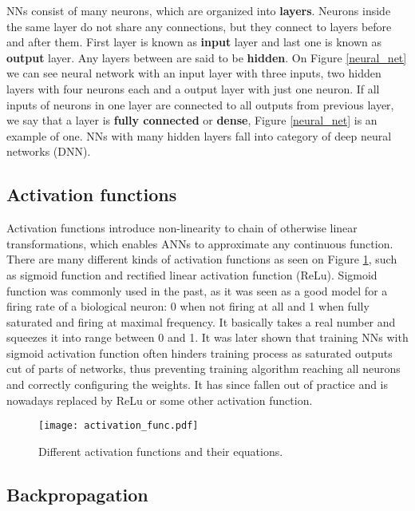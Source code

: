 NNs consist of many neurons, which are organized into \textbf{layers}.
Neurons inside the same layer do not share any connections, but they connect to layers before and after them.
First layer is known as \textbf{input} layer and last one is known as \textbf{output} layer. 
Any layers between are said to be \textbf{hidden}. 
On Figure \ref{neural_net} we can see neural network with an input layer with three inputs, two hidden layers with four neurons each and a output layer with just one neuron.
If all inputs of neurons in one layer are connected to all outputs from previous layer, we say that a layer is \textbf{fully connected} or \textbf{dense}, Figure \ref{neural_net} is an example of one.
NNs with many hidden layers fall into category of deep neural networks (DNN).


\subsection{ Activation functions}

Activation functions introduce non-linearity to chain of otherwise linear transformations, which enables ANNs to approximate any continuous function\cite{geron}.
There are many different kinds of activation functions as seen on Figure \ref{activation_functions}, such as sigmoid function and rectified linear activation function (ReLu).
Sigmoid function was commonly used in the past, as it was seen as a good model for a firing rate of a biological neuron: 0 when not firing at all and 1 when fully saturated and firing at maximal frequency\cite{cs231n}.
It basically takes a real number and squeezes it into range between 0 and 1.
It was later shown that training NNs with sigmoid activation function often hinders training process as saturated outputs cut of parts of networks, thus preventing training algorithm reaching all neurons and correctly configuring the weights\cite{cs231n}.
It has since fallen out of practice and is nowadays replaced by ReLu or some other activation function.

\begin{figure}[ht]
        \centering
        \texttt{[image: activation\_func.pdf]} 
        \caption{Different activation functions and their equations.}
        \label{activation_functions}
\end{figure}

\subsection{ Backpropagation}

